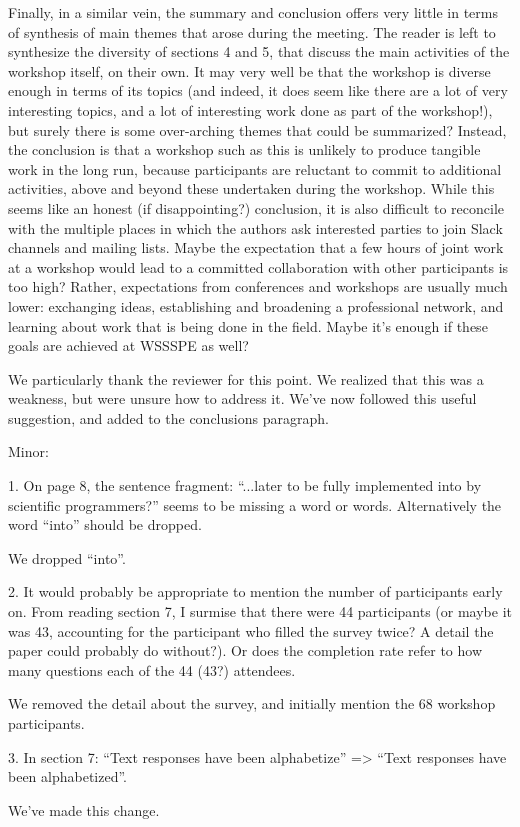 \documentclass[11pt]{article}
\begin{document}
\begin{quoting}

 
Finally, in a similar vein, the summary and conclusion offers very little in terms of synthesis of main themes that arose during the meeting. The reader is left to synthesize the diversity of sections 4 and 5, that discuss the main activities of the workshop itself, on their own. It may very well be that the workshop is diverse enough in terms of its topics (and indeed, it does seem like there are a lot of very interesting topics, and a lot of interesting work done as part of the workshop!), but surely there is some over-arching themes that could be summarized? Instead, the conclusion is that a workshop such as this is unlikely to produce tangible work in the long run, because participants are reluctant to commit to additional activities, above and beyond these undertaken during the workshop. While this seems like an honest (if disappointing?) conclusion, it is also difficult to reconcile with the multiple places in which the authors ask interested parties to join Slack channels and mailing lists. Maybe the expectation that a few hours of joint work at a workshop would lead to a committed collaboration with other participants is too high? Rather, expectations from conferences and workshops are usually much lower: exchanging ideas, establishing and broadening a professional network, and learning about work that is being done in the field. Maybe it's enough if these goals are achieved at WSSSPE as well?

\end{quoting}
 
We particularly thank the reviewer for this point.  We realized that this was a weakness, but were unsure how to address it.  We've now followed this useful suggestion, and added to the
conclusions paragraph.
 
\begin{quoting}

Minor: 

1. On page 8, the sentence fragment: ``...later to be fully implemented into by scientific programmers?'' seems to be missing a word or words. Alternatively the word ``into'' should be dropped.

\end{quoting}

We dropped ``into''.

\begin{quoting}

2. It would probably be appropriate to mention the number of participants early on. From reading section 7, I surmise that there were 44 participants (or maybe it was 43, accounting for the participant who filled the survey twice? A detail the paper could probably do without?). Or does the completion rate refer to how many questions each of the 44 (43?) attendees. 

\end{quoting}

We removed the detail about the survey, and initially mention the 68 workshop participants.

\begin{quoting}

3. In section 7: ``Text responses have been alphabetize'' => ``Text responses have been alphabetized''.

\end{quoting}

We've made this change.
\end{document}
